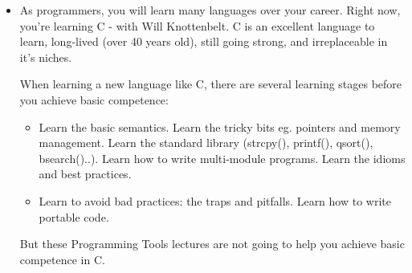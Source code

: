 \documentclass[handout]{beamer}
\begin{document}
\begin{frame}
\large
      \begin{itemize}
      \item
      As programmers, you will learn \alert{many languages} over your career.
      Right now, you're learning C - with Will Knottenbelt.
      \pause
      C is an excellent language to learn, long-lived (over 40 years old),
      still going strong, and \alert{irreplaceable in it's niches}.

      \pitem
      When learning a new language like C, there are \alert{several learning stages}
      before you achieve \alert{basic competence}:

      \begin{itemize}
      \pitem
        Learn the \alert{syntax}.
      \item
        Learn the \alert{basic semantics}.
      \pitem
        Learn the tricky bits
        eg. \alert{pointers and memory management}.
      \pitem
        Learn the \alert{standard library
	(strcpy(), printf(), qsort(), bsearch()..)}.
      \pitem
        Learn how to write \alert{multi-module programs}.
      \pitem
        Learn the \alert{idioms} and \alert{best practices}.
      \item
        Learn to avoid \alert{bad practices}: the \alert{traps} and \alert{pitfalls}.
      \pitem
        Learn how to write \alert{portable code}.
      \end{itemize}

      \pitem
      But these Programming Tools lectures are not going to help you achieve basic competence in C.

      \end{itemize}

\end{frame}
\end{document}
